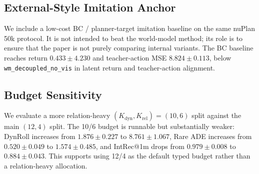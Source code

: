 \documentclass[10pt]{article}
\newcommand{\kdyn}{K_{\mathrm{dyn}}}
\newcommand{\krel}{K_{\mathrm{rel}}}
\begin{document}
\begin{table}[t]
\centering
\caption{Relation feature-group ablation on nuPlan 50k.}
\label{tab:relation_ablation}
\end{table}

\subsection{External-Style Imitation Anchor}
We include a low-cost BC / planner-target imitation baseline on the same nuPlan 50k protocol. It is not intended to beat the world-model method; its role is to ensure that the paper is not purely comparing internal variants. The BC baseline reaches return $0.433 \pm 4.230$ and teacher-action MSE $8.824 \pm 0.113$, below \texttt{wm\_decoupled\_no\_vis} in latent return and teacher-action alignment.

\subsection{Budget Sensitivity}
We evaluate a more relation-heavy $(\kdyn,\krel)=(10,6)$ split against the main $(12,4)$ split. The 10/6 budget is runnable but substantially weaker: DynRoll increases from $1.876 \pm 0.227$ to $8.761 \pm 1.067$, Rare ADE increases from $0.520 \pm 0.049$ to $1.574 \pm 0.485$, and IntRec@1m drops from $0.979 \pm 0.008$ to $0.884 \pm 0.043$. This supports using 12/4 as the default typed budget rather than a relation-heavy allocation.
\end{document}
